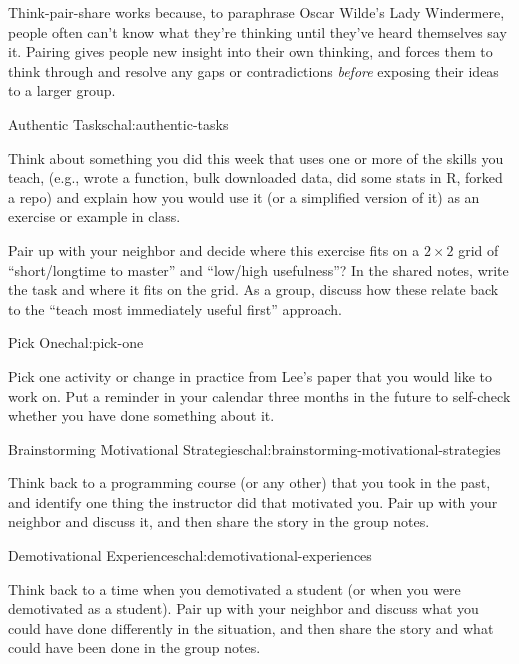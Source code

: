 Think-pair-share works because, to paraphrase Oscar Wilde's Lady
Windermere, people often can't know what they're thinking until
they've heard themselves say it.  Pairing gives people new insight
into their own thinking, and forces them to think through and resolve
any gaps or contradictions \emph{before} exposing their ideas to a
larger group.


\begin{challenge}{Authentic Tasks}{chal:authentic-tasks}

Think about something you did this week that uses one or more of the
skills you teach, (e.g., wrote a function, bulk downloaded data, did
some stats in R, forked a repo) and explain how you would use it (or a
simplified version of it) as an exercise or example in class.

Pair up with your neighbor and decide where this exercise fits on a
$2{\times}2$ grid of ``short/longtime to master'' and ``low/high
usefulness''?  In the shared notes, write the task and where it fits
on the grid. As a group, discuss how these relate back to the ``teach
most immediately useful first'' approach.

\end{challenge}

\begin{challenge}{Pick One}{chal:pick-one}

Pick one activity or change in practice from Lee's
paper \cite{bib:lee-create-inclusive-community} that you would like to
work on.  Put a reminder in your calendar three months in the future
to self-check whether you have done something about it.

\end{challenge}

\begin{challenge}{Brainstorming Motivational Strategies}{chal:brainstorming-motivational-strategies}

Think back to a programming course (or any other) that you took in the
past, and identify one thing the instructor did that motivated you.
Pair up with your neighbor and discuss it, and then share the story in
the group notes.

\end{challenge}

\begin{challenge}{Demotivational Experiences}{chal:demotivational-experiences}

Think back to a time when you demotivated a student (or when you were
demotivated as a student). Pair up with your neighbor and discuss what
you could have done differently in the situation, and then share the
story and what could have been done in the group notes.

\end{challenge}

